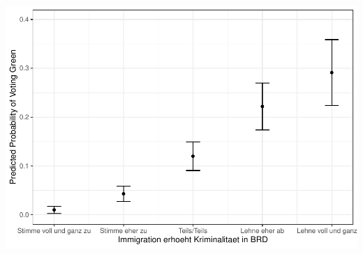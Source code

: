 \documentclass[
]{article}
\begin{document}
\includegraphics{AVCD_Final_Assignment-Edenhofer_files/figure-latex/gruene-immig-crime-1.pdf}
\end{document}
